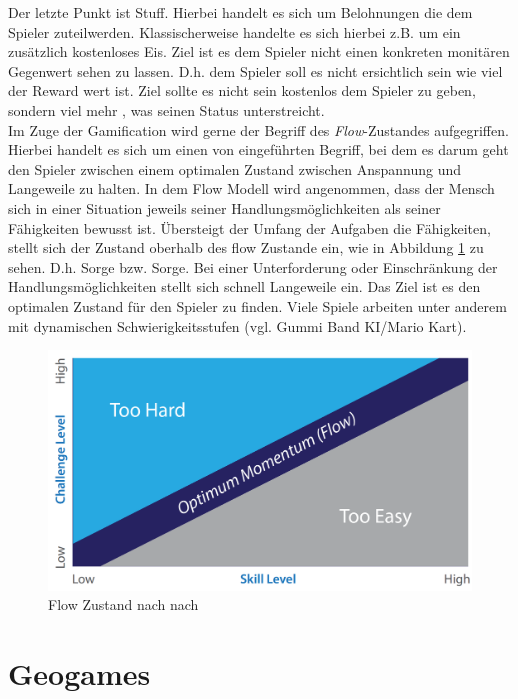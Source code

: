 Der letzte Punkt ist Stuff. Hierbei handelt es sich um Belohnungen die dem Spieler zuteilwerden. Klassischerweise handelte es sich hierbei z.B. um ein zusätzlich kostenloses Eis. Ziel ist es dem Spieler nicht einen konkreten monitären Gegenwert sehen zu lassen. D.h. dem Spieler soll es nicht ersichtlich sein wie viel der Reward wert ist. Ziel sollte es nicht sein kostenlos dem Spieler zu geben, sondern viel mehr , was seinen Status unterstreicht.\\

Im Zuge der Gamification wird gerne der Begriff des \textit{Flow}-Zustandes aufgegriffen.
Hierbei handelt es sich um einen von \cite{Csikszentmihalyi.1991} eingeführten Begriff, bei dem es darum geht den Spieler zwischen einem optimalen Zustand zwischen Anspannung und Langeweile zu halten. In dem Flow Modell wird angenommen, dass der Mensch sich in einer Situation jeweils seiner Handlungsmöglichkeiten als seiner Fähigkeiten bewusst ist.
Übersteigt der Umfang der Aufgaben die Fähigkeiten, stellt sich der Zustand oberhalb des flow Zustande ein, wie in Abbildung \ref{img:ch03_img02_flow} zu sehen. D.h. Sorge bzw. Sorge. Bei einer Unterforderung oder Einschränkung der Handlungsmöglichkeiten stellt sich schnell Langeweile ein. Das Ziel ist es den optimalen Zustand für den Spieler zu finden. Viele Spiele arbeiten unter anderem mit dynamischen Schwierigkeitsstufen (vgl. Gummi Band KI/Mario Kart).

\begin{figure}[H]
\begin{center}
\includegraphics[width=120mm]{images/ch03_img02_flow.png}
\caption{Flow Zustand nach nach \textcite{Csikszentmihalyi.1991}}
\label{img:ch03_img02_flow}
\end{center}
\end{figure}

\section{Geogames}
\label{ch3:s:Geogames}

